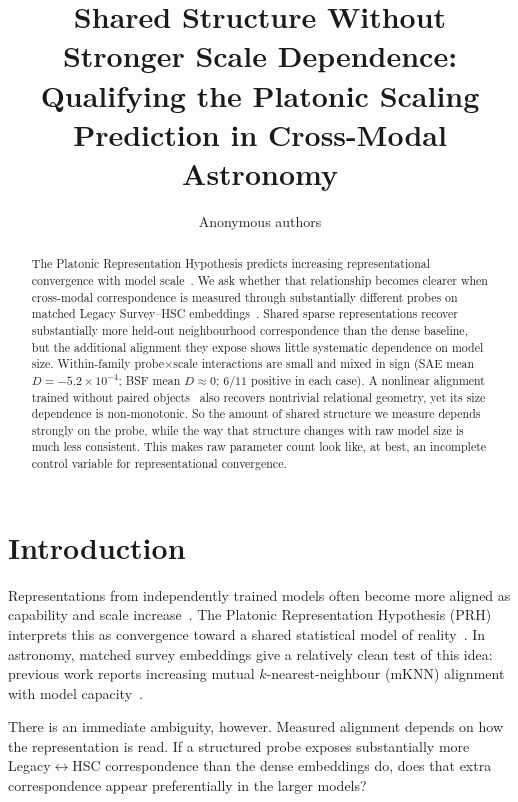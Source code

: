 \documentclass[11pt]{article}
\title{Shared Structure Without Stronger Scale Dependence:\\
Qualifying the Platonic Scaling Prediction in Cross-Modal Astronomy}
\author{Anonymous authors}
\date{}
\begin{document}
\maketitle

\begin{abstract}
The Platonic Representation Hypothesis predicts increasing representational convergence with model scale~\citep{huh2024platonic}.
We ask whether that relationship becomes clearer when cross-modal correspondence is measured through substantially different probes on matched Legacy Survey--HSC embeddings~\citep{duraphe2025platonicuniverse}.
Shared sparse representations recover substantially more held-out neighbourhood correspondence than the dense baseline, but the additional alignment they expose shows little systematic dependence on model size.
Within-family probe\(\times\)scale interactions are small and mixed in sign (SAE mean \(D{=}{-}5.2{\times}10^{-4}\); BSF mean \(D{\approx}0\); \(6/11\) positive in each case).
A nonlinear alignment trained without paired objects~\citep{jha2025vec2vec} also recovers nontrivial relational geometry, yet its size dependence is non-monotonic.
So the amount of shared structure we measure depends strongly on the probe, while the way that structure changes with raw model size is much less consistent.
This makes raw parameter count look like, at best, an incomplete control variable for representational convergence.
\end{abstract}

\section{Introduction}
\label{sec:intro}

Representations from independently trained models often become more aligned as capability and scale increase~\citep{huh2024platonic}.
The Platonic Representation Hypothesis (PRH) interprets this as convergence toward a shared statistical model of reality~\citep{huh2024platonic}.
In astronomy, matched survey embeddings give a relatively clean test of this idea: previous work reports increasing mutual \(k\)-nearest-neighbour (mKNN) alignment with model capacity~\citep{duraphe2025platonicuniverse}.

There is an immediate ambiguity, however.
Measured alignment depends on how the representation is read.
If a structured probe exposes substantially more Legacy\(\leftrightarrow\)HSC correspondence than the dense embeddings do, does that extra correspondence appear preferentially in the larger models?
\end{document}
